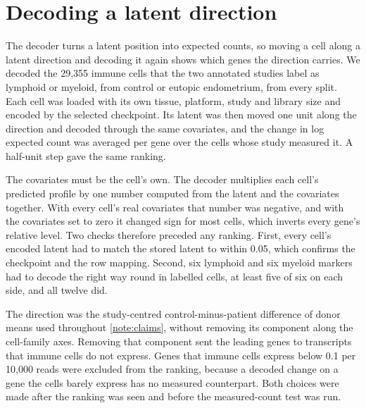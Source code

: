 
\section{Decoding a latent direction}
\label{note:decoding}

The decoder turns a latent position into expected counts, so moving a cell
along a latent direction and decoding it again shows which genes the
direction carries. We decoded the 29{,}355 immune cells that the two
annotated studies label as lymphoid or myeloid, from control or eutopic
endometrium, from every split. Each cell was loaded with its own tissue,
platform, study and library size and encoded by the selected checkpoint.
Its latent was then moved one unit along the direction and decoded through
the same covariates, and the change in log expected count was averaged per
gene over the cells whose study measured it. A half-unit step gave the same
ranking.

The covariates must be the cell's own. The decoder multiplies each cell's
predicted profile by one number computed from the latent and the
covariates together. With every cell's real covariates that number was
negative, and with the covariates set to zero it changed sign for most
cells, which inverts every gene's relative level. Two checks therefore
preceded any ranking. First, every cell's encoded latent had to match the
stored latent to within 0.05, which confirms the checkpoint and the row
mapping. Second, six lymphoid and six myeloid markers had to decode the
right way round in labelled cells, at least five of six on each side, and
all twelve did.

The direction was the study-centred control-minus-patient difference of
donor means used throughout \ref{note:claims}, without removing its
component along the cell-family axes. Removing that component sent the
leading genes to transcripts that immune cells do not express. Genes that
immune cells express below 0.1 per 10{,}000 reads were excluded from the
ranking, because a decoded change on a gene the cells barely express has
no measured counterpart. Both choices were made after the ranking was seen
and before the measured-count test was run.

